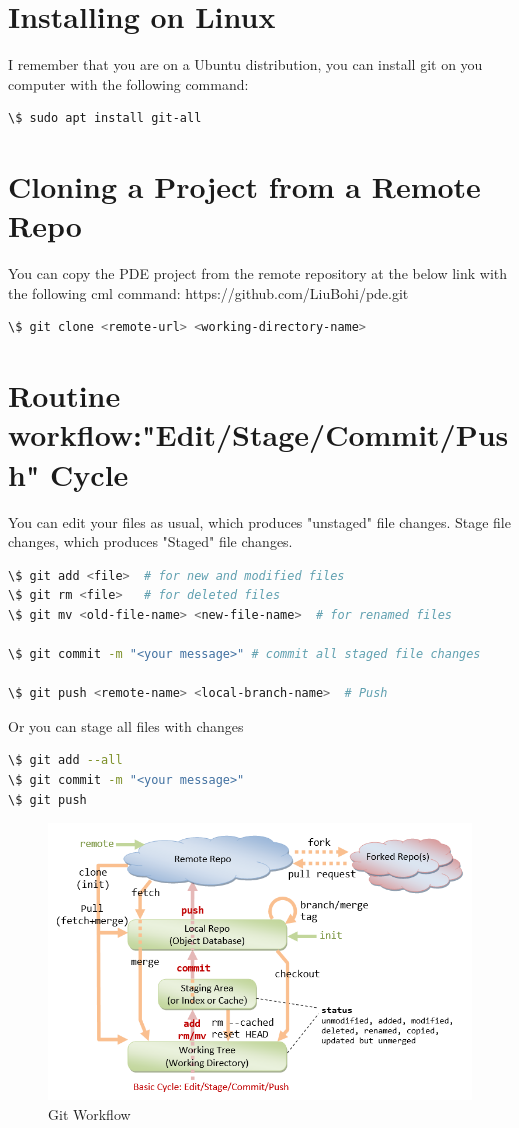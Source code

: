 \documentclass[a4paper]{article}
\begin{document}
\section{Installing on Linux}
I remember that you are on a Ubuntu distribution,  you can install git on you computer with the following command:
\begin{lstlisting}[language=bash]
\$ sudo apt install git-all
\end{lstlisting}

\section{Cloning a Project from a Remote Repo}

You can copy the PDE project from the remote repository at the below link with the following cml command:
https://github.com/LiuBohi/pde.git

\begin{lstlisting}[language=bash]
\$ git clone <remote-url> <working-directory-name>
\end{lstlisting}

\section{Routine workflow:"Edit/Stage/Commit/Push" Cycle}
You can edit your files as usual, which produces "unstaged" file changes.
Stage file changes, which produces "Staged" file changes.
\begin{lstlisting}[language=bash]
\$ git add <file>  # for new and modified files
\$ git rm <file>   # for deleted files
\$ git mv <old-file-name> <new-file-name>  # for renamed files

\$ git commit -m "<your message>" # commit all staged file changes

\$ git push <remote-name> <local-branch-name>  # Push
\end{lstlisting}

Or you can stage all files with changes
\begin{lstlisting}[language=bash]
\$ git add --all
\$ git commit -m "<your message>"
\$ git push
\end{lstlisting}

\begin{figure}
\centerline{\includegraphics{Git_StorageDataFlow.png}}
\caption{Git Workflow}
\end{figure}
\end{document}
